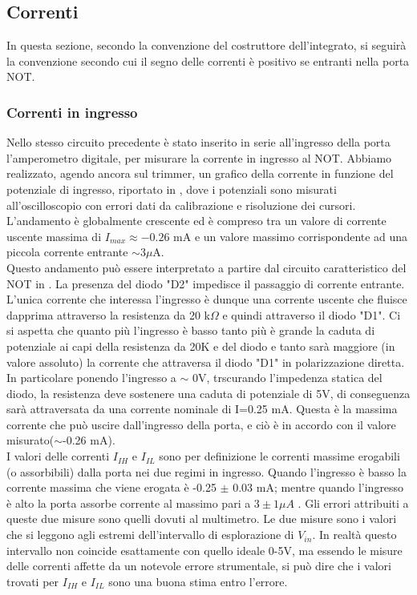 \subsection{Correnti}
In questa sezione, secondo la convenzione del costruttore dell'integrato, si seguirà la convenzione secondo cui il segno delle correnti è positivo se entranti nella porta NOT.\\
\subsubsection{Correnti in ingresso}
Nello stesso circuito precedente è stato inserito in serie all'ingresso della porta l'amperometro digitale, per misurare la corrente in ingresso al NOT.
Abbiamo realizzato, agendo ancora sul trimmer, un grafico della corrente in funzione del potenziale di ingresso, riportato in , dove i potenziali sono misurati all'oscilloscopio con errori dati da calibrazione e risoluzione dei cursori.\\
L'andamento è globalmente crescente  ed è  compreso tra un valore di corrente uscente massima di $I_{max}\approx -0.26$ mA e un valore massimo corrispondente ad una piccola corrente entrante $\sim 3 \mu$A. \\
Questo andamento può essere interpretato a partire dal circuito caratteristico del NOT in . La presenza del diodo "D2" impedisce il passaggio di corrente entrante. L'unica corrente che interessa l'ingresso è dunque una corrente uscente che fluisce dapprima attraverso la resistenza da 20 k$\Omega$ e quindi attraverso il diodo "D1". Ci si aspetta che quanto più l'ingresso è basso tanto più è grande la caduta di potenziale ai capi della resistenza da 20K e del diodo e tanto sarà maggiore (in valore assoluto) la corrente che attraversa il diodo "D1" in polarizzazione diretta. In particolare ponendo l'ingresso a $\sim$ 0V, trscurando l'impedenza statica del diodo, la resistenza deve sostenere una caduta di potenziale di 5V, di conseguenza sarà attraversata da una corrente nominale di I=0.25 mA. Questa è la massima corrente che può uscire dall'ingresso della porta, e ciò è in accordo con il valore misurato($\sim$-0.26 mA).\\
I valori delle correnti $I_{IH}$ e $I_{IL}$ sono per definizione le correnti massime erogabili (o assorbibili) dalla porta nei due regimi in ingresso. Quando l'ingresso è basso la corrente massima che viene erogata è -0.25 $\pm$ 0.03 mA; mentre quando l'ingresso è alto la porta assorbe corrente al massimo pari a $3 \pm 1 \mu A$ . Gli errori attribuiti a queste due misure sono quelli dovuti al multimetro. Le due misure sono i valori che si leggono agli estremi dell'intervallo di esplorazione di $V_{in}$. In realtà questo intervallo non coincide esattamente con quello ideale 0-5V, ma essendo le misure delle correnti affette da un notevole errore strumentale, si può dire che i valori trovati per $I_{IH}$ e $I_{IL}$ sono una buona stima entro l'errore.

